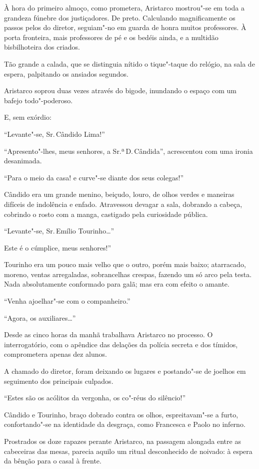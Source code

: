 À hora do primeiro almoço, como
prometera, Aristarco mostrou"-se em toda a grandeza fúnebre dos
justiçadores. De preto. Calculando magnificamente os passos pelos do
diretor, seguiam"-no em guarda de honra muitos professores. À porta
fronteira, mais professores de pé e os bedéis ainda, e a multidão
bisbilhoteira dos criados. 

Tão grande a calada, que se distinguia
nítido o tique"-taque do relógio, na sala de espera, palpitando os
ansiados segundos. 

Aristarco soprou duas vezes através do bigode,
inundando o espaço com um bafejo todo"-poderoso. 

E, sem exórdio:

``Levante"-se, Sr.\,Cândido Lima!'' 

``Apresento"-lhes, meus senhores, a
Sr.ª\,D.\,Cândida'', acrescentou com uma ironia desanimada. 

``Para o meio da casa! e curve"-se diante dos seus colegas!'' 

Cândido era um grande
menino, beiçudo, louro, de olhos verdes e maneiras difíceis de
indolência e enfado. Atravessou devagar a sala, dobrando a cabeça,
cobrindo o rosto com a manga, castigado pela curiosidade pública.

``Levante"-se, Sr.\,Emílio Tourinho\ldots{}'' 

Este é o cúmplice, meus senhores!'' 

Tourinho era um pouco mais velho que o outro, porém mais
baixo; atarracado, moreno, ventas arregaladas, sobrancelhas crespas,
fazendo um só arco pela testa. Nada absolutamente conformado para galã;
mas era com efeito o amante. 

``Venha ajoelhar"-se com o companheiro.''

``Agora, os auxiliares\ldots{}'' 

Desde as cinco horas da manhã trabalhava
Aristarco no processo. O interrogatório, com o apêndice das delações da
polícia secreta e dos tímidos, comprometera apenas dez alunos. 

A chamado do diretor, foram deixando os lugares e postando"-se de
joelhos em seguimento dos principais culpados. 

``Estes são os acólitos da vergonha, os co"-réus do silêncio!'' 

Cândido e Tourinho, braço
dobrado contra os olhos, espreitavam"-se a furto, confortando"-se na
identidade da desgraça, como Francesca e Paolo no inferno. 

Prostrados os doze rapazes perante Aristarco, na passagem alongada entre as
cabeceiras das mesas, parecia aquilo um ritual desconhecido de noivado:
à espera da bênção para o casal à frente. 

